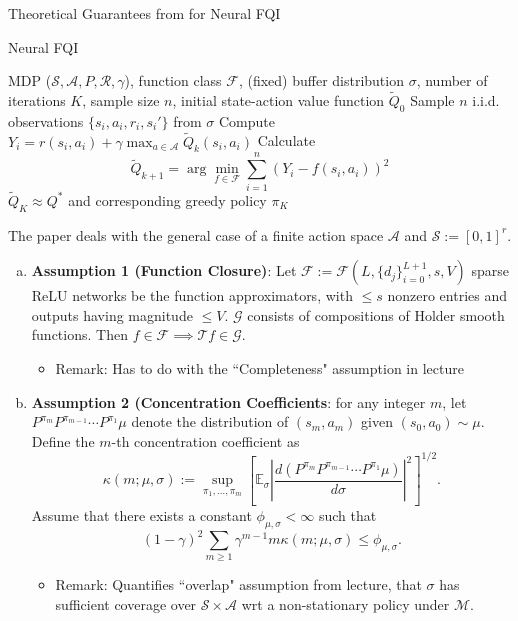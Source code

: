 \documentclass[final]{beamer}
\newlength{\colwidth}
\begin{document}
\begin{frame}[t]
\begin{columns}[t]
\begin{column}{\colwidth}
\begin{block}{Theoretical Guarantees from \cite{theor} for Neural FQI}
\begin{algorithm}[H]%
   \caption{Neural FQI}
   \label{FQI}
\begin{algorithmic}
    MDP ($\mathcal{S}, \mathcal{A}, P, \mathcal{R}, \gamma$), function class $\mathcal{F}$, (fixed) buffer distribution $\sigma$, number of iterations $K$, sample size $n$, initial state-action value function $\widetilde{Q}_0$
   \STATE Sample $n$ i.i.d. observations $\{s_i, a_i, r_i, s_i'\}$ from $\sigma$ 
   \STATE Compute $Y_i = r(s_i, a_i) + \gamma \max_{a \in \mathcal{A}} \widetilde{Q}_k(s_i, a_i)$
   \STATE Calculate $$\widetilde{Q}_{k+1} = \arg \min_{f \in \mathcal{F}} \sum_{i=1}^n \left(Y_i - f(s_i, a_i)\right)^2$$
   \ENDFOR
   \OUTPUT $\widetilde{Q}_K \approx Q^*$ and corresponding greedy policy $\pi_K$
\end{algorithmic}
\end{algorithm}
The paper deals with the general case of a finite action space $\mathcal{A}$ and $\mathcal{S} := [0,1]^r$.  
\begin{enumerate}[(a)]%
 \item \textbf{Assumption 1 (Function Closure)}: Let $\mathcal{F} := \mathcal{F}(L, \{d_j\}_{i=0}^{L+1},s, V)$ sparse ReLU networks be the function approximators, with $\le s$ nonzero entries and outputs having magnitude $\le V$.  $\mathcal{G}$ consists of compositions of Holder smooth functions.  Then $f \in \mathcal{F} \implies \mathcal{T}f \in \mathcal{G}$.
 \begin{itemize}
     \item Remark:  Has to do with the ``Completeness" assumption in lecture
 \end{itemize}
 \item \textbf{Assumption 2 (Concentration Coefficients}: for any integer $m$, let $P^{\pi_m}P^{\pi_{m-1}} \cdots P^{\pi_1}\mu$ denote the distribution of $(s_m, a_m)$ given $(s_0, a_0) \sim \mu$.  Define the $m$-th concentration coefficient as $$\kappa(m; \mu, \sigma) := \sup_{\pi_1, \dots, \pi_m} \left[\mathbb{E}_{\sigma} \left| \frac{d(P^{\pi_m}P^{\pi_{m-1}} \cdots P^{\pi_1}\mu)}{d \sigma} \right|^2 \right]^{1/2}.$$ Assume that there exists a constant $\phi_{\mu, \sigma} < \infty$ such that $$(1-\gamma)^2 \sum_{m \ge 1} \gamma^{m-1} m \kappa(m; \mu, \sigma) \le \phi_{\mu, \sigma}.$$
 \begin{itemize}
     \item Remark: Quantifies ``overlap" assumption from lecture, that $\sigma$ has sufficient coverage over $\mathcal{S} \times \mathcal{A}$ wrt a non-stationary policy under $\mathcal{M}$.

\end{itemize}
\end{enumerate}
\end{block}
\end{column}
\end{columns}
\end{frame}
\end{document}
